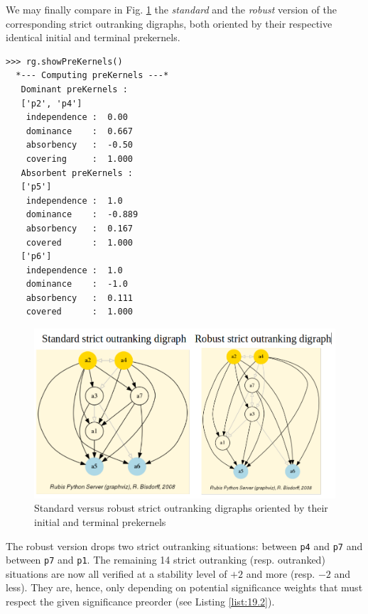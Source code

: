 We may finally compare in Fig. \ref{fig:19.1} the \emph{standard} and the \emph{robust} version of the corresponding strict outranking digraphs, both oriented by their respective identical initial and terminal prekernels.
\begin{lstlisting}
>>> rg.showPreKernels()
  *--- Computing preKernels ---*
   Dominant preKernels :
   ['p2', 'p4']
    independence :  0.00
    dominance    :  0.667
    absorbency   :  -0.50
    covering     :  1.000
   Absorbent preKernels :
   ['p5']
    independence :  1.0
    dominance    :  -0.889
    absorbency   :  0.167
    covered      :  1.000
   ['p6']
    independence :  1.0
    dominance    :  -1.0
    absorbency   :  0.111
    covered      :  1.000
\end{lstlisting}
\begin{figure}[h]
\includegraphics[width=12cm]{Figures/robStdStrictOutranking.png}
\caption{Standard versus robust strict outranking digraphs oriented by their initial and terminal prekernels} 
\label{fig:19.1}       %
\end{figure}
   
The robust version drops two strict outranking situations: between \texttt{p4} and \texttt{p7} and between \texttt{p7} and \texttt{p1}. The remaining 14 strict outranking (resp. outranked) situations are now all verified at a stability level of $+2$ and more (resp. $-2$ and less). They are, hence, only depending on potential significance weights that must respect the given significance preorder (see Listing \ref{list:19.2}).

